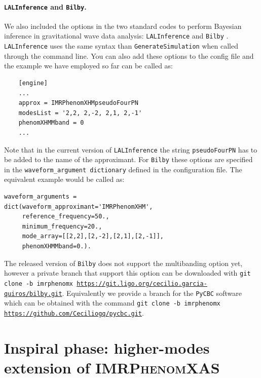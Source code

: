\documentclass[twocolumn,prd,aps,superscriptaddress,preprintnumbers,tightenlines,showpacs,nofootinbib,eqsecnum,amsfonts,amsmath]{revtex4}
\newcommand{\phX}{\textsc{IMRPhenomXAS}\xspace}
\begin{document}

\paragraph{\texttt{LALInference} and \texttt{Bilby}.}

We also included the options in the two standard codes to perform Bayesian inference in gravitational wave data analysis: \texttt{LALInference}\cite{LALInference} and \texttt{Bilby} \cite{Ashton:2018jfp}. \texttt{LALInference} uses the same syntax than \texttt{GenerateSimulation} when called through the command line. You can also add these options to the config file and the example we have employed so far can be called as:
\begin{verbatim}
    [engine]
    ...
    approx = IMRPhenomXHMpseudoFourPN
    modesList = '2,2, 2,-2, 2,1, 2,-1'
    phenomXHMMband = 0
    ...
\end{verbatim}
Note that in the current version of \texttt{LALInference} the string \texttt{pseudoFourPN} has to be added to the name of the approximant.
For \texttt{Bilby} these options are specified in the \texttt{waveform\_argument dictionary} defined in the configuration file. The equivalent example would be called as:
\begin{verbatim}
waveform_arguments = 
dict(waveform_approximant='IMRPhenomXHM',
     reference_frequency=50.,
     minimum_frequency=20.,
     mode_array=[[2,2],[2,-2],[2,1],[2,-1]],
     phenomXHMMband=0.).
\end{verbatim}

The released version of \texttt{Bilby} does not support the multibanding option yet, however a private branch that support this option can be downloaded with \texttt{git clone -b imrphenomx \url{https://git.ligo.org/cecilio.garcia-quiros/bilby.git}}.  Equivalently we provide a branch for the \texttt{PyCBC} software \cite{pycbc} which can be obtained with the command \texttt{git clone -b imrphenomx \url{https://github.com/Ceciliogq/pycbc.git}}.


\section{Inspiral phase: higher-modes extension of \phX}
\label{app:inspiral_hm}
\end{document}
